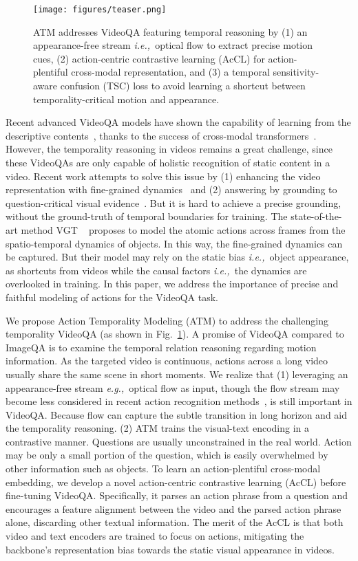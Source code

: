 \documentclass[sigconf]{acmart}
\newcommand{\ie}{\emph{i.e.,~}}
\newcommand{\eg}{\emph{e.g.,~}}
\begin{document}
\begin{figure}[t]
\centering
\texttt{[image: figures/teaser.png]}
\caption{ATM addresses VideoQA featuring temporal reasoning by (1) an appearance-free stream \ie optical flow to extract precise motion cues, (2) action-centric contrastive learning (AcCL) for action-plentiful cross-modal representation, and (3) a temporal sensitivity-aware confusion (TSC) loss to avoid learning a shortcut between temporality-critical motion and appearance. 
  }
\label{fig:teaser}
\end{figure}
Recent advanced VideoQA models have shown the capability of learning from the descriptive contents~\cite{lei2018tvqa, lei2019tvqa+}, thanks to the success of cross-modal transformers~\cite{li2020hero,lei2021less}. However, the temporality reasoning in videos remains a great challenge, since these VideoQAs are only capable of holistic recognition of static content in a video. 
Recent work attempts to solve this issue by (1) enhancing the video representation with fine-grained dynamics~\cite{xiao2022vgt,xiao2022hqga} and (2) answering by grounding to question-critical visual evidence~\cite{li2022equivariant,li2022invariant}. 
But it is hard to achieve a precise grounding, without the ground-truth of temporal boundaries for training. 
The state-of-the-art method VGT ~\cite{xiao2022vgt} proposes to model the atomic actions across frames from the spatio-temporal dynamics of objects. 
In this way, the fine-grained dynamics can be captured. But their model may rely on the static bias \ie object appearance, as shortcuts from videos while the causal factors \ie the dynamics are overlooked in training. 
In this paper, we address the importance of precise and faithful modeling of actions for the VideoQA task.


We propose Action Temporality Modeling (ATM) to address the challenging temporality VideoQA (as shown in Fig.~\ref{fig:teaser}). 
A promise of VideoQA compared to ImageQA is to examine the temporal relation reasoning regarding motion information. As the targeted video is continuous, actions across a long video usually share the same scene in short moments. 
We realize that (1) leveraging an appearance-free stream \eg optical flow as input, though the flow stream may become less considered in recent action recognition methods~\cite{bertasius2021space,feichtenhofer2019slowfast}, is still important in VideoQA. Because flow can capture the subtle transition in long horizon and aid the temporality reasoning. 
(2) ATM trains the visual-text encoding in a contrastive manner. Questions are usually unconstrained in the real world. Action may be only a small portion of the question, which is easily overwhelmed by other information such as objects. 
To learn an action-plentiful cross-modal embedding, we develop a novel action-centric contrastive learning (AcCL) before fine-tuning VideoQA. 
Specifically, it parses an action phrase from a question and encourages a feature alignment between the video and the parsed action phrase alone, discarding other textual information. 
The merit of the AcCL is that both video and text encoders are trained to focus on actions, mitigating the backbone's representation bias towards the static visual appearance in videos. 
\end{document}
